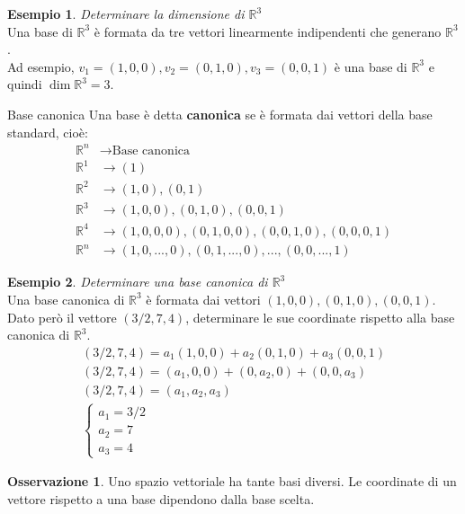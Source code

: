 \documentclass[a4paper]{article}
\theoremstyle{definition}
\newtheorem*{oss}{Osservazione}
\newtheorem*{es}{Esempio}
\begin{document}
\begin{es}
	\textit{Determinare la dimensione di $\mathbb{R}^3$} \\
	Una base di $\mathbb{R}^3$ è formata da tre vettori linearmente indipendenti che generano $\mathbb{R}^3$. \\
	Ad esempio, $v_1 = (1, 0, 0), v_2 = (0, 1, 0), v_3 = (0, 0, 1)$ è una base di $\mathbb{R}^3$ e quindi $\dim \mathbb{R}^3 = 3$.
\end{es}
\begin{deff}{Base canonica}{}
	Una base è detta \textbf{canonica} se è formata dai vettori della base standard, cioè:
	\begin{align*}
		\mathbb{R}^n & \rightarrow \text{Base canonica}                                   \\
		\mathbb{R}^1 & \rightarrow (1)                                                    \\
		\mathbb{R}^2 & \rightarrow (1, 0), (0, 1)                                         \\
		\mathbb{R}^3 & \rightarrow (1, 0, 0), (0, 1, 0), (0, 0, 1)                        \\
		\mathbb{R}^4 & \rightarrow (1, 0, 0, 0), (0, 1, 0, 0), (0, 0, 1, 0), (0, 0, 0, 1) \\
		\mathbb{R}^n & \rightarrow (1, 0, ..., 0), (0, 1, ..., 0), ..., (0, 0, ..., 1)
	\end{align*}
\end{deff}
\begin{es}
	\textit{Determinare una base canonica di $\mathbb{R}^3$} \\
	Una base canonica di $\mathbb{R}^3$ è formata dai vettori $(1, 0, 0), (0, 1, 0), (0, 0, 1)$.
	Dato però il vettore $(3/2, 7, 4)$, determinare le sue coordinate rispetto alla base canonica di $\mathbb{R}^3$.
	\begin{align*}
		(3/2, 7, 4) = a_1(1, 0, 0) + a_2(0, 1, 0) + a_3(0, 0, 1) \\
		(3/2, 7, 4) = (a_1, 0, 0) + (0, a_2, 0) + (0, 0, a_3)    \\
		(3/2, 7, 4) = (a_1, a_2, a_3)                            \\
		\begin{cases}
			a_1 = 3/2 \\
			a_2 = 7   \\
			a_3 = 4
		\end{cases}
	\end{align*}
\end{es}
\begin{oss}
	Uno spazio vettoriale ha tante basi diversi. Le coordinate di un vettore rispetto a una base dipendono dalla base scelta.
\end{oss}
\end{document}
